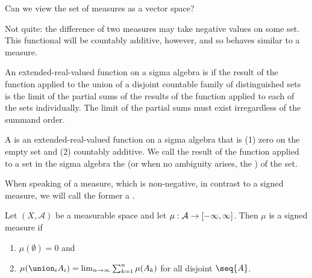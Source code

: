 
\sbasic
























\sstart
{}


Can we view the set of
measures as a vector space?

Not quite:
the difference of two measures
may take negative values
on some set.
This functional
will be countably
additive, however, and
so behaves similar to a measure.


An extended-real-valued
function on a
sigma algebra is
if the result of the function applied to
the union of a disjoint countable family of
distinguished sets is the limit of the partial
sums of the results of the function applied
to each of the sets individually.
The limit of the partial sums must
exist irregardless of the summand order.

A
is an extended-real-valued
function on a
sigma algebra that is
(1) zero on the empty set and
(2) countably additive.
We call the result of the function
applied to a set in the sigma
algebra the
(or when no ambiguity arises, the
)
of the set.

When speaking of a measure,
which is non-negative,
in contrast to a signed measure,
we will call the former a
.


Let
$(X, \mathcal{A})$
be a measurable space
and let
$\mu: \mathcal{A} \to [-\infty,\infty]$.
Then $\mu$ is a signed measure if
\begin{enumerate}
  \item $\mu(\emptyset) = 0$ and
  \item
  $\mu(\union_{i} A_i) =
    \lim_{n \to \infty}
      \sum_{k = 1}^{n} \mu(A_k)$
  for all disjoint $\seq{A}$.
\end{enumerate}

